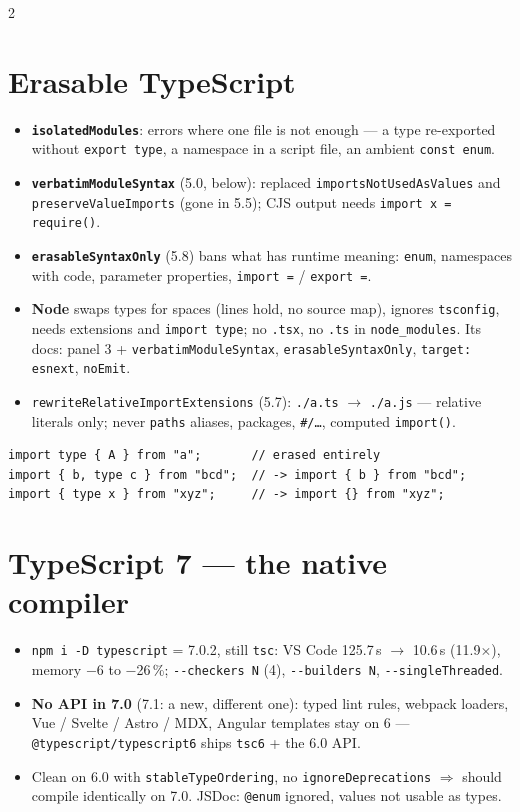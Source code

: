 \documentclass[8pt]{extarticle}
\newcommand\ct[1]{\texttt{#1}}
\newcommand\dd{-\pdfonly{\kern0pt}-}
\begin{document}
\begin{multicols}{2}
\columnbreak

\section{Erasable TypeScript}
\begin{itemize}
  \item \ct{\textbf{isolatedModules}}: errors where one file is not enough — a type re-exported
        without \ct{export type}, a namespace in a script file, an ambient \ct{const enum}.
  \item \ct{\textbf{verbatimModuleSyntax}} (5.0, below): replaced \ct{importsNotUsedAsValues} and
        \ct{preserveValueImports} (gone in 5.5); CJS output needs \ct{import x = require()}.
  \item \ct{\textbf{erasableSyntaxOnly}} (5.8) bans what has runtime meaning: \ct{enum}, namespaces
        with code, parameter properties, \ct{import =} / \ct{export =}.
  \item \textbf{Node} swaps types for spaces (lines hold, no source map), ignores \ct{tsconfig},
        needs extensions and \ct{import type}; no \ct{.tsx}, no \ct{.ts} in \ct{node\_modules}.
        Its docs: panel 3 + \ct{verbatimModuleSyntax}, \ct{erasableSyntaxOnly},
        \ct{target: esnext}, \ct{noEmit}.
  \item \ct{rewriteRelativeImportExtensions} (5.7): \ct{./a.ts} $\to$ \ct{./a.js} — relative
        literals only; never \ct{paths} aliases, packages, \ct{\#/…}, computed \ct{import()}.
\end{itemize}
\begin{lstlisting}[language=TSSheet]
import type { A } from "a";       // erased entirely
import { b, type c } from "bcd";  // -> import { b } from "bcd";
import { type x } from "xyz";     // -> import {} from "xyz";
\end{lstlisting}

\section{TypeScript 7 — the native compiler}
\begin{itemize}
  \item \ct{npm i -D typescript} = 7.0.2, still \ct{tsc}: VS Code 125.7\,s $\to$ 10.6\,s
        (11.9$\times$), memory $-$6 to $-$26\,\%; \ct{\dd{}checkers N} (4), \ct{\dd{}builders N},
        \ct{\dd{}singleThreaded}.
  \item \textbf{No API in 7.0} (7.1: a new, different one): typed lint rules, webpack loaders,
        Vue / Svelte / Astro / MDX, Angular templates stay on 6 — \ct{@typescript/typescript6}
        ships \ct{tsc6} + the 6.0 API.
  \item Clean on 6.0 with \ct{stableTypeOrdering}, no \ct{ignoreDeprecations} $\Rightarrow$
        should compile identically on 7.0. JSDoc: \ct{@enum} ignored, values not usable as types.
\end{itemize}


\end{multicols}
\end{document}

